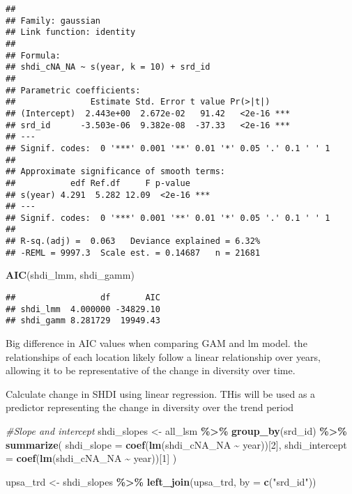 \documentclass[
]{article}
\newenvironment{Shaded}{\begin{snugshade}}{\end{snugshade}}
\newcommand{\AttributeTok}[1]{\textcolor[rgb]{0.13,0.29,0.53}{#1}}
\newcommand{\CommentTok}[1]{\textcolor[rgb]{0.56,0.35,0.01}{\textit{#1}}}
\newcommand{\DecValTok}[1]{\textcolor[rgb]{0.00,0.00,0.81}{#1}}
\newcommand{\FunctionTok}[1]{\textcolor[rgb]{0.13,0.29,0.53}{\textbf{#1}}}
\newcommand{\NormalTok}[1]{#1}
\newcommand{\OtherTok}[1]{\textcolor[rgb]{0.56,0.35,0.01}{#1}}
\newcommand{\SpecialCharTok}[1]{\textcolor[rgb]{0.81,0.36,0.00}{\textbf{#1}}}
\newcommand{\StringTok}[1]{\textcolor[rgb]{0.31,0.60,0.02}{#1}}
\begin{document}
\begin{verbatim}
## 
## Family: gaussian 
## Link function: identity 
## 
## Formula:
## shdi_cNA_NA ~ s(year, k = 10) + srd_id
## 
## Parametric coefficients:
##               Estimate Std. Error t value Pr(>|t|)    
## (Intercept)  2.443e+00  2.672e-02   91.42   <2e-16 ***
## srd_id      -3.503e-06  9.382e-08  -37.33   <2e-16 ***
## ---
## Signif. codes:  0 '***' 0.001 '**' 0.01 '*' 0.05 '.' 0.1 ' ' 1
## 
## Approximate significance of smooth terms:
##           edf Ref.df     F p-value    
## s(year) 4.291  5.282 12.09  <2e-16 ***
## ---
## Signif. codes:  0 '***' 0.001 '**' 0.01 '*' 0.05 '.' 0.1 ' ' 1
## 
## R-sq.(adj) =  0.063   Deviance explained = 6.32%
## -REML = 9997.3  Scale est. = 0.14687   n = 21681
\end{verbatim}

\begin{Shaded}
\begin{Highlighting}[]
\FunctionTok{AIC}\NormalTok{(shdi\_lmm, shdi\_gamm)}
\end{Highlighting}
\end{Shaded}

\begin{verbatim}
##                 df       AIC
## shdi_lmm  4.000000 -34829.10
## shdi_gamm 8.281729  19949.43
\end{verbatim}

Big difference in AIC values when comparing GAM and lm model. the
relationships of each location likely follow a linear relationship over
years, allowing it to be representative of the change in diversity over
time.

Calculate change in SHDI using linear regression. THis will be used as a
predictor representing the change in diversity over the trend period

\begin{Shaded}
\begin{Highlighting}[]
\CommentTok{\#Slope and intercept}
\NormalTok{shdi\_slopes }\OtherTok{\textless{}{-}}\NormalTok{ all\_lsm }\SpecialCharTok{\%\textgreater{}\%}
  \FunctionTok{group\_by}\NormalTok{(srd\_id) }\SpecialCharTok{\%\textgreater{}\%}
  \FunctionTok{summarize}\NormalTok{(}
    \AttributeTok{shdi\_slope =} \FunctionTok{coef}\NormalTok{(}\FunctionTok{lm}\NormalTok{(shdi\_cNA\_NA }\SpecialCharTok{\textasciitilde{}}\NormalTok{ year))[}\DecValTok{2}\NormalTok{],  }
    \AttributeTok{shdi\_intercept =} \FunctionTok{coef}\NormalTok{(}\FunctionTok{lm}\NormalTok{(shdi\_cNA\_NA }\SpecialCharTok{\textasciitilde{}}\NormalTok{ year))[}\DecValTok{1}\NormalTok{] }
\NormalTok{  )}

\NormalTok{upsa\_trd }\OtherTok{\textless{}{-}}\NormalTok{ shdi\_slopes }\SpecialCharTok{\%\textgreater{}\%}
  \FunctionTok{left\_join}\NormalTok{(upsa\_trd, }\AttributeTok{by =} \FunctionTok{c}\NormalTok{(}\StringTok{"srd\_id"}\NormalTok{))}
\end{Highlighting}
\end{Shaded}
\end{document}
